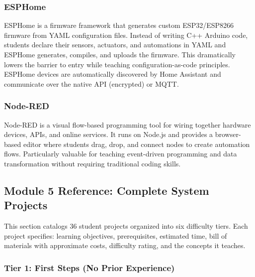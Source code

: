 \documentclass[11pt,letterpaper]{article}
\begin{document}
\subsubsection{ESPHome}

ESPHome is a firmware framework that generates custom ESP32/ESP8266 firmware from YAML configuration files. Instead of writing C++ Arduino code, students declare their sensors, actuators, and automations in YAML and ESPHome generates, compiles, and uploads the firmware. This dramatically lowers the barrier to entry while teaching configuration-as-code principles. ESPHome devices are automatically discovered by Home Assistant and communicate over the native API (encrypted) or MQTT.

\subsubsection{Node-RED}

Node-RED is a visual flow-based programming tool for wiring together hardware devices, APIs, and online services. It runs on Node.js and provides a browser-based editor where students drag, drop, and connect nodes to create automation flows. Particularly valuable for teaching event-driven programming and data transformation without requiring traditional coding skills.

\subsection{Module 5 Reference: Complete System Projects}

This section catalogs 36 student projects organized into six difficulty tiers. Each project specifies: learning objectives, prerequisites, estimated time, bill of materials with approximate costs, difficulty rating, and the concepts it teaches.

\subsubsection{Tier 1: First Steps (No Prior Experience)}
\end{document}
